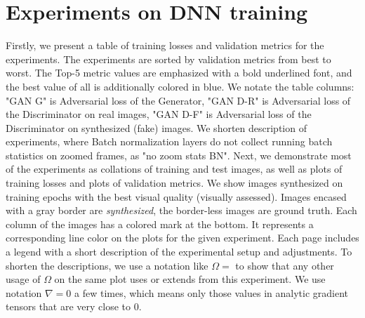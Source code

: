 
\clearpage
\newpage


\section{Experiments on DNN training}
\label{appb:exps}

Firstly, we present a table of training losses and validation metrics for the experiments. The experiments are sorted by validation metrics from best to worst. The Top-5 metric values are emphasized with a bold underlined font, and the best value of all is additionally colored in blue. We notate the table columns: "GAN G" is Adversarial loss of the Generator, "GAN D-R" is Adversarial loss of the Discriminator on real images, "GAN D-F" is Adversarial loss of the Discriminator on synthesized (fake) images. We shorten description of experiments, where Batch normalization layers do not collect running batch statistics on zoomed frames, as "no zoom stats BN". Next, we demonstrate most of the experiments as collations of training and test images, as well as plots of training losses and plots of validation metrics. We show images synthesized on training epochs with the best visual quality (visually assessed). Images encased with a gray border are \textit{synthesized}, the border-less images are ground truth. Each column of the images has a colored mark at the bottom. It represents a corresponding line color on the plots for the given experiment. Each page includes a legend with a short description of the experimental setup and adjustments. To shorten the descriptions, we use a notation like $\Omega=$ to show that any other usage of $\Omega$ on the same plot uses or extends from this experiment. We use notation $\nabla=0$ a few times, which means only those values in analytic gradient tensors that are very close to 0.

